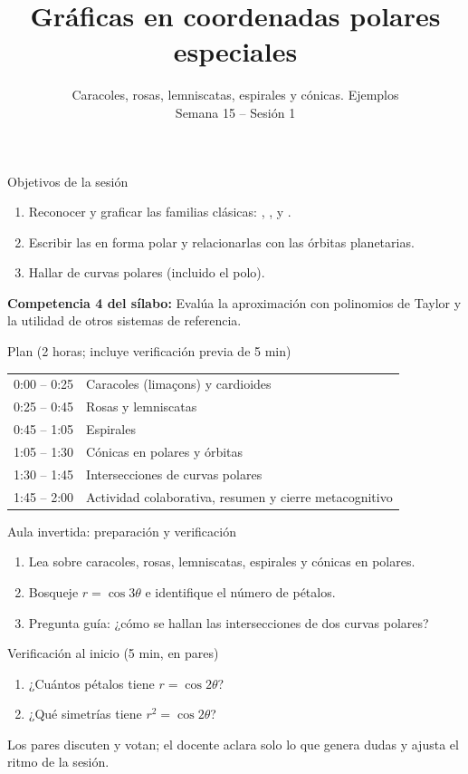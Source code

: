 \documentclass[10pt,aspectratio=169]{beamer}
\title[Gráficas polares especiales]{Gráficas en coordenadas polares especiales}
\subtitle{Caracoles, rosas, lemniscatas, espirales y cónicas. Ejemplos\\[2pt]\small Semana 15 -- Sesión 1}
\begin{document}
\begin{frame}
  \titlepage
\end{frame}

\begin{frame}{Objetivos de la sesión}
  \begin{enumerate}
    \item Reconocer y graficar las familias clásicas: , ,  y .
    \item Escribir las  en forma polar y relacionarlas con las órbitas planetarias.
    \item Hallar  de curvas polares (incluido el polo).
  \end{enumerate}
  \vspace{1mm}
  {\small\textbf{Competencia 4 del sílabo:} Evalúa la aproximación con polinomios de Taylor y la utilidad de otros sistemas de referencia.}
  \begin{block}{Plan (2 horas; incluye verificación previa de 5 min)}
    \begin{tabular}{ll}
      0:00 -- 0:25 & Caracoles (limaçons) y cardioides\\
      0:25 -- 0:45 & Rosas y lemniscatas\\
      0:45 -- 1:05 & Espirales\\
      1:05 -- 1:30 & Cónicas en polares y órbitas\\
      1:30 -- 1:45 & Intersecciones de curvas polares\\
      1:45 -- 2:00 & Actividad colaborativa, resumen y cierre metacognitivo
    \end{tabular}
  \end{block}
\end{frame}

\begin{frame}{Aula invertida: preparación y verificación}
  \small
  \begin{previa}
    \begin{enumerate}
      \item Lea sobre caracoles, rosas, lemniscatas, espirales y cónicas en polares.
      \item Bosqueje $r=\cos3\theta$ e identifique el número de pétalos.
      \item Pregunta guía: ¿cómo se hallan las intersecciones de dos curvas polares?
    \end{enumerate}
  \end{previa}
  \begin{block}{Verificación al inicio (5 min, en pares)}
    \begin{enumerate}
      \item ¿Cuántos pétalos tiene $r=\cos2\theta$?
      \item ¿Qué simetrías tiene $r^2=\cos2\theta$?
    \end{enumerate}
    Los pares discuten y votan; el docente aclara solo lo que genera dudas y ajusta el ritmo de la sesión.
  \end{block}
\end{frame}
\end{document}
